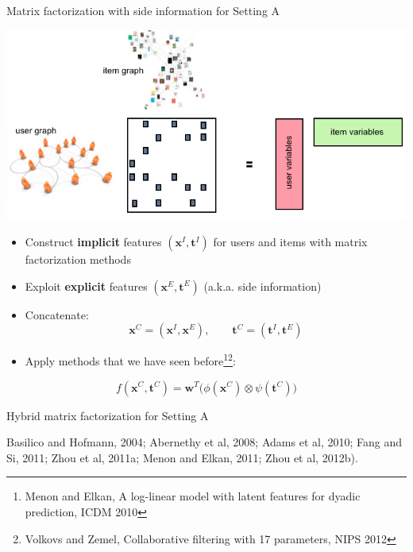 \documentclass[]{beamer}
\renewcommand{\vec}[1]{\boldsymbol{#1}}
\renewcommand{\alert}[1]{\textbf{\color{putblue} #1}}
\begin{document}
\begin{frame}{Matrix factorization with side information for Setting A}

\begin{center}
\includegraphics[scale=0.3]{pics/settingA}
\end{center}
\begin{itemize}
\item Construct \alert{implicit} features $(\vec{x}^I,\vec{t}^I)$ for users and items with matrix factorization methods
\item Exploit \alert{explicit} features $(\vec{x}^E,\vec{t}^E)$ (a.k.a. side information)
\item Concatenate: 
$$\vec{x}^C = (\vec{x}^I,\vec{x}^E), \qquad \vec{t}^C = (\vec{t}^I,\vec{t}^E)$$
\item Apply methods that we have seen before\footnote{Menon and Elkan, A log-linear model with latent features for dyadic prediction, ICDM 2010}\footnote{Volkovs and Zemel, Collaborative filtering with 17 parameters, NIPS 2012}: 
\end{itemize}
\begin{equation*}
\label{eq:pairwise}
f(\vec{x}^C,\vec{t}^C) = \vec{w}^T \big(\phi(\vec{x}^C) \otimes \psi(\vec{t}^C)\big)    
\end{equation*}
\vspace{-0.2cm}
\end{frame}

\begin{frame}{Hybrid matrix factorization for Setting A}

Basilico and Hofmann, 2004;
Abernethy et al, 2008; Adams et al, 2010; Fang and Si, 2011; Zhou et al, 2011a; Menon and
Elkan, 2011; Zhou et al, 2012b).

\end{frame}
\end{document}
